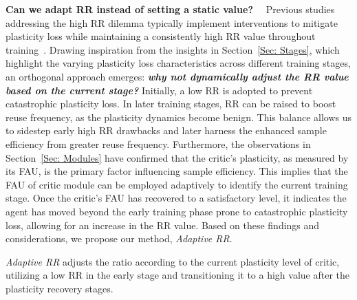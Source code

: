 \textbf{Can we adapt RR instead of setting a static value?}~~
Previous studies addressing the high RR dilemma typically implement interventions to mitigate plasticity loss while maintaining a consistently high RR value throughout training~\citep{breaking_RR_barrier, dormant_neuron, Plasticity_Injection}.
Drawing inspiration from the insights in Section~\ref{Sec: Stages}, which highlight the varying plasticity loss characteristics across different training stages, an orthogonal approach emerges: \textbf{\textit{why not dynamically adjust the RR value based on the current stage?}}
Initially, a low RR is adopted to prevent catastrophic plasticity loss.
In later training stages, RR can be raised to boost reuse frequency, as the plasticity dynamics become benign.
This balance allows us to sidestep early high RR drawbacks and later harness the enhanced sample efficiency from greater reuse frequency.
Furthermore, the observations in Section~\ref{Sec: Modules} have confirmed that the critic's plasticity, as measured by its FAU, is the primary factor influencing sample efficiency.
This implies that the FAU of critic module can be employed adaptively to identify the current training stage.
Once the critic's FAU has recovered to a satisfactory level, it indicates the agent has moved beyond the early training phase prone to catastrophic plasticity loss, allowing for an increase in the RR value. 
Based on these findings and considerations, we propose our method, \textit{Adaptive RR}.

\begin{tcolorbox}[enhanced,colback=white,%
    colframe=C1!75!black, attach boxed title to top right={yshift=-\tcboxedtitleheight/2, xshift=-.75cm}, title=\textbf{Adaptive Replay Ratio}, coltitle=C1!75!black, boxed title style={size=small,colback=white,opacityback=1, opacityframe=0}, size=title, enlarge top initially by=-\tcboxedtitleheight/2]
    \vspace{0.3em}
\textcolor{C1!25!black}{\textit{Adaptive RR} adjusts the ratio according to the current plasticity level of critic, utilizing a low RR in the early stage and transitioning it to a high value after the plasticity recovery stages.}
\vspace{0.2em}
\end{tcolorbox}





